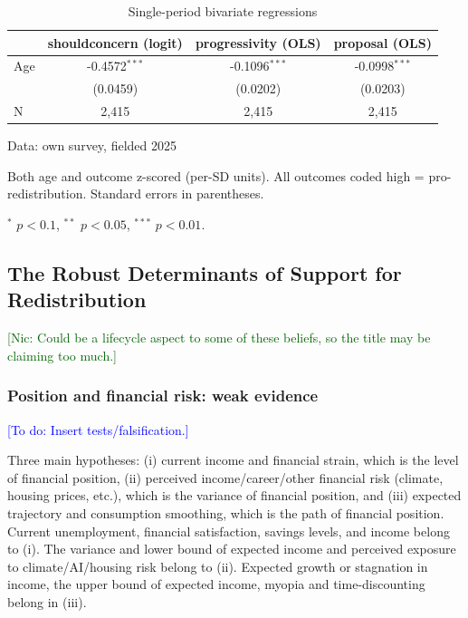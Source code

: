 \documentclass[11pt, headsepline]{article}
\newcommand{\nic}[1]{\noindent\textcolor{darkgreen}{[Nic: #1]}}
\newcommand{\todo}[1]{\noindent\textcolor{blue}{[To do: #1]}}
\begin{document}
\begin{table}[H]
\caption{Single-period bivariate regressions}
\centering
\begin{threeparttable}

\begin{tabular}{lccc}
\toprule
 & shouldconcern (logit) & progressivity (OLS) & proposal (OLS) \\
\midrule
Age & -0.4572$^{***}$ & -0.1096$^{***}$ & -0.0998$^{***}$ \\
    & (0.0459) & (0.0202) & (0.0203) \\
\midrule
N & 2,415 & 2,415 & 2,415 \\
\bottomrule
\end{tabular}
\begin{tablenotes}[flushleft]
\footnotesize
\item Data: own survey, fielded 2025
\item Both age and outcome z-scored (per-SD units). All outcomes coded high =
pro-redistribution. Standard errors in parentheses.
\item $^{*}$ $p<0.1$, $^{**}$ $p<0.05$, $^{***}$ $p<0.01$.
\end{tablenotes}
\end{threeparttable}
\end{table}

\subsection{The Robust Determinants of Support for Redistribution}


\nic{Could be a lifecycle aspect to some of these beliefs, so the title may be claiming too much.}

\subsubsection{Position and financial risk: weak evidence}



\todo{Insert tests/falsification.}

Three main hypotheses: (i) current income and financial strain, which is the level of financial position, (ii) perceived income/career/other financial risk (climate, housing prices, etc.), which is the variance of financial position, and (iii) expected trajectory and consumption smoothing, which is the path of financial position. Current unemployment, financial satisfaction, savings levels, and income belong to (i). The variance and lower bound of expected income and perceived exposure to climate/AI/housing risk belong to (ii). Expected growth or stagnation in income, the upper bound of expected income, myopia and time-discounting belong in (iii). 
\end{document}
